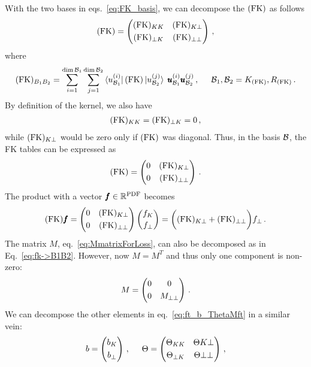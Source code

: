 With the two bases in eqs.~\eqref{eq:FK_basis}, we can decompose the $(\mathrm{FK})$ as follows
\begin{equation}
  (\mathrm{FK}) =
  \begin{pmatrix}
    (\mathrm{FK})_{KK}     & (\mathrm{FK})_{K\bot} \\[3pt]
    (\mathrm{FK})_{\bot K} & (\mathrm{FK})_{\bot\bot}
  \end{pmatrix} \,,
\end{equation}
where
\begin{align}
  (\mathrm{FK})_{B_1 B_2} = \sum_{i=1}^{\dim\mathcal{B}_1} \sum_{j=1}^{\dim\mathcal{B}_2}
  \bra{u_{\mathcal{B}_1}^{(i)}} (\mathrm{FK}) \ket{u_{\mathcal{B}_2}^{(j)}} \;
  \pmb{u}_{\mathcal{B}_1}^{(i)} \pmb{u}_{\mathcal{B}_2}^{(j)}\,,
  \hspace{5mm}
  \mathcal{B}_1, \mathcal{B}_2 = K_{(\mathrm{FK})}, R_{(\mathrm{FK})}\,.
  \label{eq:fk->B1B2}
\end{align}
By definition of the kernel, we also have
\begin{align}
  (\mathrm{FK})_{KK} = (\mathrm{FK})_{\bot K} = 0 \,,
\end{align}
while $(\mathrm{FK})_{K\bot}$ would be zero only if $(\mathrm{FK})$ was diagonal. Thus, in the basis
$\mathcal{B}$, the FK tables can be expressed as
\begin{align}
  (\mathrm{FK}) =
  \begin{pmatrix}
    0  & (\mathrm{FK})_{K\bot} \\[3pt]
    0 & (\mathrm{FK})_{\bot\bot}
  \end{pmatrix} \,.
\end{align}
The product with a vector $\pmb{f} \in \mathbb{R}^{\textrm{PDF}}$ becomes
\begin{equation}
  (\mathrm{FK}) \pmb{f} =
    \begin{pmatrix}
      0  & (\mathrm{FK})_{K\bot} \\[3pt]
      0  & (\mathrm{FK})_{\bot\bot}
    \end{pmatrix}
    \begin{pmatrix} 
      f_K \\[2pt]
      f_{\bot}
    \end{pmatrix}
    = \biggl((\mathrm{FK})_{K\bot} + (\mathrm{FK})_{\bot\bot}\biggr) f_{\bot} \,.
\end{equation}
The matrix $M$, eq.~\eqref{eq:MmatrixForLoss}, can also be decomposed as in Eq.~\eqref{eq:fk->B1B2}. However, now
$M=M^T$ and thus only one component is non-zero:
\begin{align}
  M =
  \begin{pmatrix}
    0 & 0 \\[3pt]
    0 & M_{\bot\bot}
  \end{pmatrix} \,.
  \label{eq:fk_projection_basis}
\end{align}
We can decompose the other elements in eq.~\eqref{eq:ft_b_ThetaMft} in a similar vein:
\begin{align}
  b = \begin{pmatrix} b_{K} \\[3pt] b_{\bot} \end{pmatrix} \,,
  \hspace{5mm}
  \Theta = \begin{pmatrix}
    \Theta_{KK} & \Theta{K\bot} \\[3pt]
    \Theta_{\bot K} & \Theta{\bot\bot}
  \end{pmatrix} \,,
\end{align}
